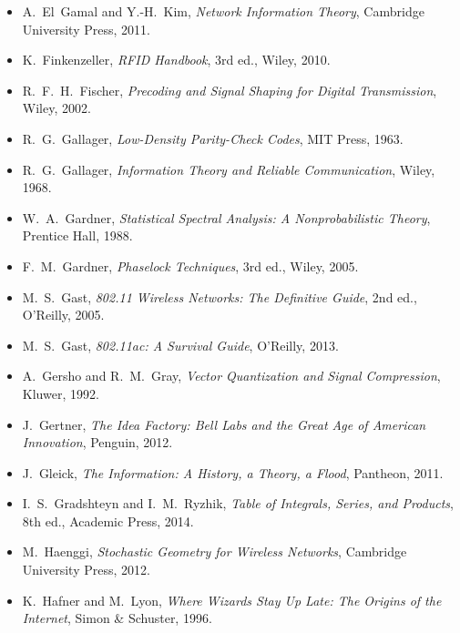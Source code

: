 \begin{itemize}[leftmargin=1.5em,itemindent=-1.5em,itemsep=1.5pt plus 1pt,parsep=0pt,topsep=4pt,label={}]
\item A.~El~Gamal and Y.-H.~Kim, \emph{Network Information Theory}, Cambridge University Press, 2011.
\item K.~Finkenzeller, \emph{RFID Handbook}, 3rd ed., Wiley, 2010.
\item R.~F.~H.~Fischer, \emph{Precoding and Signal Shaping for Digital Transmission}, Wiley, 2002.
\item R.~G.~Gallager, \emph{Low-Density Parity-Check Codes}, MIT Press, 1963.
\item R.~G.~Gallager, \emph{Information Theory and Reliable Communication}, Wiley, 1968.
\item W.~A.~Gardner, \emph{Statistical Spectral Analysis: A Nonprobabilistic Theory}, Prentice Hall, 1988.
\item F.~M.~Gardner, \emph{Phaselock Techniques}, 3rd ed., Wiley, 2005.
\item M.~S.~Gast, \emph{802.11 Wireless Networks: The Definitive Guide}, 2nd ed., O'Reilly, 2005.
\item M.~S.~Gast, \emph{802.11ac: A Survival Guide}, O'Reilly, 2013.
\item A.~Gersho and R.~M.~Gray, \emph{Vector Quantization and Signal Compression}, Kluwer, 1992.
\item J.~Gertner, \emph{The Idea Factory: Bell Labs and the Great Age of American Innovation}, Penguin, 2012.
\item J.~Gleick, \emph{The Information: A History, a Theory, a Flood}, Pantheon, 2011.
\item I.~S.~Gradshteyn and I.~M.~Ryzhik, \emph{Table of Integrals, Series, and Products}, 8th ed., Academic Press, 2014.
\item M.~Haenggi, \emph{Stochastic Geometry for Wireless Networks}, Cambridge University Press, 2012.
\item K.~Hafner and M.~Lyon, \emph{Where Wizards Stay Up Late: The Origins of the Internet}, Simon \& Schuster, 1996.

\end{itemize}
